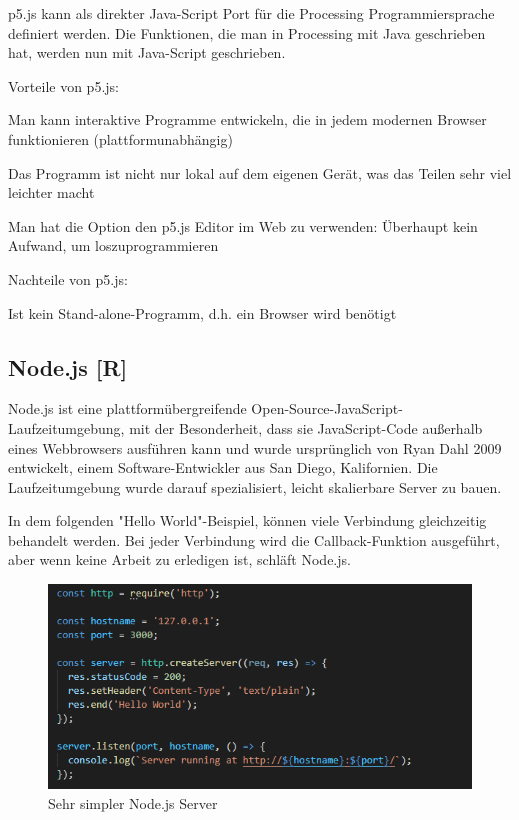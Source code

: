 p5.js kann als direkter Java-Script Port für die Processing Programmiersprache definiert werden. Die Funktionen, die man in Processing mit Java geschrieben hat, werden nun mit Java-Script geschrieben.

Vorteile von p5.js:
\begin{compactitem}
    \item Man kann interaktive Programme entwickeln, die in jedem modernen Browser funktionieren (plattformunabhängig)
    \item Das Programm ist nicht nur lokal auf dem eigenen Gerät, was das Teilen sehr viel leichter macht
    \item Man hat die Option den p5.js Editor im Web zu verwenden: Überhaupt kein Aufwand, um loszuprogrammieren
\end{compactitem}

Nachteile von p5.js:
\begin{compactitem}
    \item Ist kein Stand-alone-Programm, d.h. ein Browser wird benötigt
\end{compactitem}

\subsection {Node.js [R]}
Node.js ist eine plattformübergreifende Open-Source-JavaScript-Laufzeitumgebung, mit der Besonderheit, dass sie JavaScript-Code außerhalb eines Webbrowsers ausführen kann
und wurde ursprünglich von Ryan Dahl 2009 entwickelt, einem Software-Entwickler aus San Diego, Kalifornien.
Die Laufzeitumgebung wurde darauf spezialisiert, leicht skalierbare Server zu bauen.

In dem folgenden "Hello World"-Beispiel, können viele Verbindung gleichzeitig behandelt werden. Bei jeder Verbindung wird die Callback-Funktion ausgeführt, aber wenn keine Arbeit zu erledigen ist, schläft Node.js.

\begin{figure}[H]
    \centering
    \includegraphics[scale=1]{pics/node js.PNG}
    \caption{Sehr simpler Node.js Server}
\end{figure}

